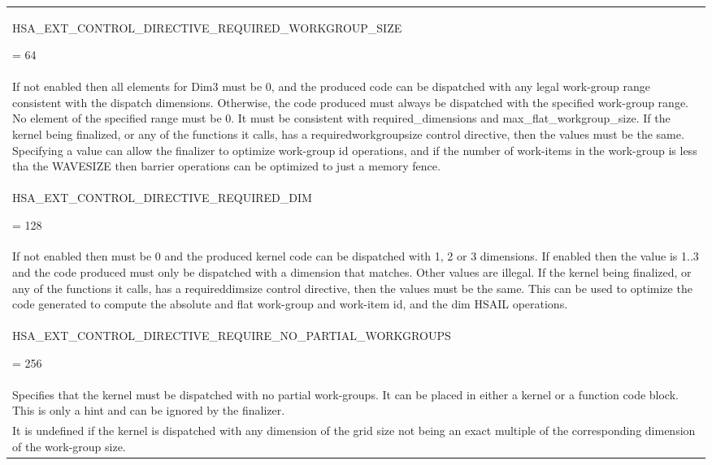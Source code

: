 \documentclass[final]{book}
\newcommand{\reftyp}[1]{#1}
\newcommand{\refenu}[1]{\reftyp{#1}}
\begin{document}
\begin{longtable}{@{\hspace{2em}}p{\linewidth-2em}}
\hspace{-2em}\hypertarget{group__finalizer_1gga143d9e622dfd7889d52fb5eb5ed1ffdbab26301028f39a1ac099aae9e74251438}{\refenu{HSA_\-EXT_\-CONTROL_\-DIRECTIVE_\-REQUIRED_\-WORKGROUP_\-SIZE}} = 64\\If not enabled then all elements for Dim3 must be 0, and the produced code can be dispatched with any legal work-group range consistent with the dispatch dimensions. Otherwise, the code produced must always be dispatched with the specified work-group range. No element of the specified range must be 0. It must be consistent with required_\-dimensions and max_\-flat_\-workgroup_\-size. If the kernel being finalized, or any of the functions it calls, has a requiredworkgroupsize control directive, then the values must be the same. Specifying a value can allow the finalizer to optimize work-group id operations, and if the number of work-items in the work-group is less tha the WAVESIZE then barrier operations can be optimized to just a memory fence.\\[2mm]
\hspace{-2em}\hypertarget{group__finalizer_1gga143d9e622dfd7889d52fb5eb5ed1ffdba87989d5d2c63b0bb44b15e0788bfe850}{\refenu{HSA_\-EXT_\-CONTROL_\-DIRECTIVE_\-REQUIRED_\-DIM}} = 128\\If not enabled then must be 0 and the produced kernel code can be dispatched with 1, 2 or 3 dimensions. If enabled then the value is 1..3 and the code produced must only be dispatched with a dimension that matches. Other values are illegal. If the kernel being finalized, or any of the functions it calls, has a requireddimsize control directive, then the values must be the same. This can be used to optimize the code generated to compute the absolute and flat work-group and work-item id, and the dim HSAIL operations.\\[2mm]
\hspace{-2em}\hypertarget{group__finalizer_1gga143d9e622dfd7889d52fb5eb5ed1ffdba5b5049bc2b376e60b9b92337e343ee18}{\refenu{HSA_\-EXT_\-CONTROL_\-DIRECTIVE_\-REQUIRE_\-NO_\-PARTIAL_\-WORKGROUPS}} = 256\\Specifies that the kernel must be dispatched with no partial work-groups. It can be placed in either a kernel or a function code block. This is only a hint and can be ignored by the finalizer.\\[2mm]
It is undefined if the kernel is dispatched with any dimension of the grid size not being an exact multiple of the corresponding dimension of the work-group size.\\[2mm]

\end{longtable}
\end{document}
